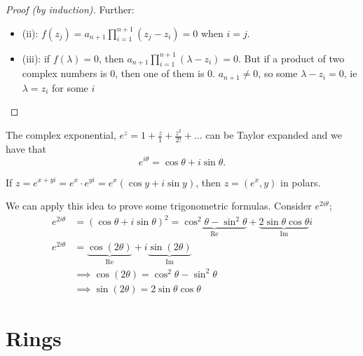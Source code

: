 \documentclass[12pt,oneside]{article}
\begin{document}
\begin{proof}[Proof (by induction)]
  Further:

  \begin{itemize}
    \item (ii): $f(z_j) = a_{n+1} \prod_{i=1}^{n+1} (z_j - z_i) = 0$ when $i =j$.

    \item (iii): if $f(\lambda) = 0$, then $a_{n+1} \prod_{i=1}^{n+1}(\lambda - z_i) = 0$. But if a product of two complex numbers is 0, then one of them is 0. $a_{n+1} \neq 0$, so some $\lambda - z_i = 0$, ie $\lambda = z_i$ for some $i$\footnotemark
  \end{itemize}
\end{proof}

\begin{definition}
  The complex exponential, $e^z = 1 + \frac{z}{1} + \frac{z^2}{2!} + \dots$ can be Taylor expanded and we have that \[e^{i \theta} = \cos \theta + i \sin \theta.\]
\end{definition}

\begin{example}
  If $z = e^{x+yi} = e^x \cdot e^{yi} = e^x (\cos y + i \sin y)$, then $z = (e^x, y)$ in polars.

  We can apply this idea to prove some trigonometric formulas. Consider $e^{2i \theta}$; \begin{align*}
      e^{2i \theta} &= (\cos \theta + i \sin \theta)^2 = \underbrace{\cos^2 \theta - \sin^2 \theta}_{\text{Re}} + \underbrace{2 \sin \theta \cos \theta }_{\text{Im}}i\\
      e^{2i \theta} &= \underbrace{\cos(2 \theta)}_{\text{Re}} + i \underbrace{\sin (2 \theta)}_{\text{Im}}\\
      &\implies \cos(2 \theta) = \cos^2 \theta - \sin^2 \theta\\
      &\implies \sin(2 \theta) = 2 \sin \theta \cos \theta
    \end{align*}
\end{example}



\section{Rings}
\end{document}

